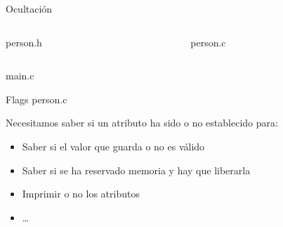 \documentclass{mybeamer}
\begin{document}
\begin{framesubsec}{Ocultación}

	\begin{columns}[onlytextwidth]
		\begin{column}{0.4\textwidth}
			\centering
			person.h
			
		\end{column}

		\begin{column}{0.4\textwidth}
			\centering
			person.c
			
		\end{column}
	\end{columns}

	\centering
	main.c
	
\end{framesubsec}

\begin{framesubsec}[flags]{Flags}
	person.c
	
	\vspace{2em}
	Necesitamos saber si un atributo ha sido o no establecido para:
	\begin{itemize}
		\item Saber si el valor que guarda o no es válido
		\item Saber si se ha reservado memoria y hay que liberarla
		\item Imprimir o no los atributos
		\item \ldots
	\end{itemize}
\end{framesubsec}
\end{document}
